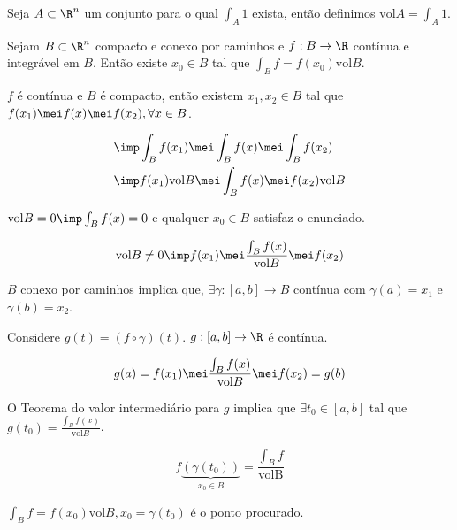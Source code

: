 \documentclass[11pt, oneside, a4paper]{gsm-l}
\begin{document}
\begin{defi}
Seja $A \subset \R^n$ um conjunto para o qual $\int_A 1$ exista, então definimos $\text{vol}A = \int_A 1$.
\end{defi}

\begin{teo}
Sejam $B \subset \R^n$ compacto e conexo por caminhos e $f:B \to \R$ contínua e integrável em $B$. Então existe $x_0 \in B$ tal que $\int_B f = f(x_0)\text{vol}B$.
\end{teo}

\begin{dem}
\begin{sloppypar}
$f$ é contínua e $B$ é compacto, então existem $x_1, x_2 \in B$ tal que ${f(x_1) \mei f(x) \mei f(x_2), \forall x \in B}$.
\end{sloppypar}

\[
\begin{gathered}
  \imp \int_B {f(x_1)} \mei \int_B {f(x)} \mei \int_B {f(x_2)} \hfill \\
  \imp f(x_1)\text{vol}B \mei \int_B {f(x)} \mei f(x_2)\text{vol}B \hfill \\ 
\end{gathered} 
\]

$\text{vol}B = 0 \imp \int_B {f(x)} = 0$ e qualquer $x_0 \in B$ satisfaz o enunciado.

\[
\text{vol}B \ne 0 \imp f(x_1) \mei \frac{\int_B {f(x)}}{\text{vol}B} \mei f(x_2)
\]

$B$ conexo por caminhos implica que, $\exists \gamma:[a,b] \to B$ contínua com $\gamma(a) = x_1$ e $\gamma(b) = x_2$.

Considere $g(t) = (f \circ \gamma)(t)$. $g:[a,b] \to \R$ é contínua.

\[
g(a) = f(x_1) \mei \frac{\int_B {f(x)}}{\text{vol}B} \mei f(x_2) = g(b)
\]

\begin{sloppypar}
O Teorema do valor intermediário para $g$ implica que $\exists t_0 \in [a,b]$ tal que ${g(t_0) = \frac{\int_B {f(x)}}{\text{vol}B}}$.
\end{sloppypar}

\[
f\underbrace {\left( {\gamma (t_0 )} \right)}_{x_0  \in B} = \frac{{\int_B f }}{\text{volB}}
\]

$\int_B f = f(x_0)\text{vol}B, x_0 = \gamma (t_0)$ é o ponto procurado.
\end{dem}
\end{document}
